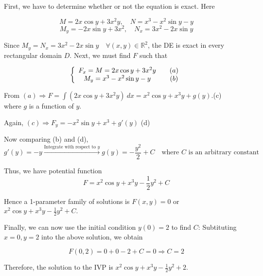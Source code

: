 \begin{solution}
    First, we have to determine whether or not the equation is exact. Here 

    \[
        M = 2x\cos y + 3x^2y, \quad N = x^3 - x^2\sin y - y
    \]
    \[
        M_y = -2x\sin y + 3x^2, \quad N_x = 3x^2 - 2x\sin y
    \]

    Since $M_y = N_x = 3x^2 - 2x\sin y \quad \forall (x, y) \in \mathbb{R}^2$, the DE is exact in every rectangular
    domain $D$. Next, we must find $F$ such that

    \[
        \left\{
        \begin{array}{cc}
         F_x = M = 2x\cos y + 3x^2y & \quad \refstepcounter{equation}(a)\\
         M_y = x^3 - x^2\sin y - y & \quad \refstepcounter{equation}(b)
        \end{array}
        \right.
        \]
    
        From $(a) \Rightarrow F = \int (2x\cos y + 3x^2y)\> dx = x^2\cos y + x^3y + g(y)$.\quad (c)\\
        where $g$ is a function of $y$.

        Again, $(c) \Rightarrow F_y = -x^2\sin y + x^3 + g'(y)$ \quad (d)

        Now comparing (b) and (d), 
        \[
            g'(y) = -y \xrightarrow[]{\text{Integrate with respect to } y} g(y) = -\frac{y^2}{2} + C \quad 
            \text{where } C \text{ is an arbitrary constant}
        \]

        Thus, we have potential function 
        \[
            F = x^2\cos y + x^3y - \frac{1}{2}y^2 + C
        \]

        Hence a 1-parameter family of solutions is $F(x,y) = 0$ or 
        $\displaystyle x^2\cos y + x^3y - \frac{1}{2}y^2 + C$.

        Finally, we can now use the initial condition $y(0) = 2$ to find $C$: Subtituting 
        $x = 0, y = 2$ into the above solution, we obtain

        \[
            F(0, 2) = 0 + 0 - 2 + C = 0 \Rightarrow C = 2
        \]

        Therefore, the solution to the IVP is $\displaystyle x^2\cos y + x^3y - \frac{1}{2}y^2 + 2$.
\end{solution}